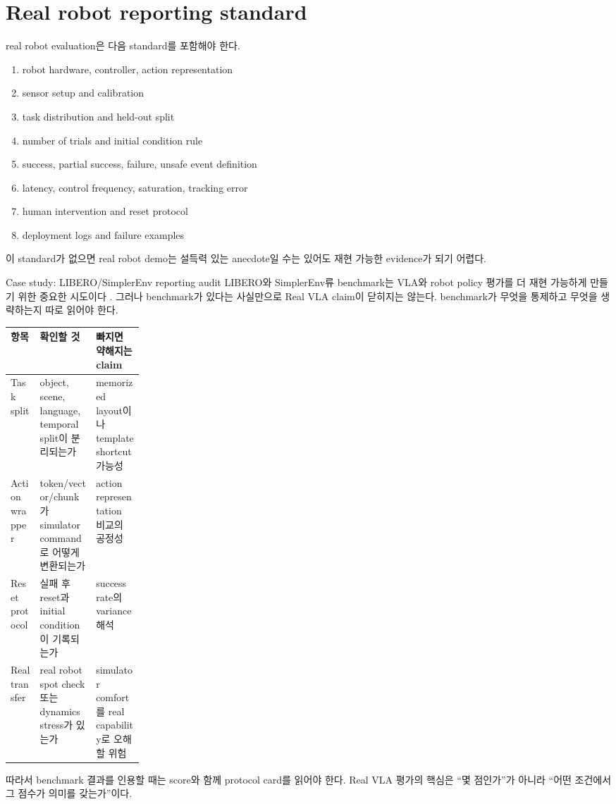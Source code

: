 \section{Real robot reporting standard}

real robot evaluation은 다음 standard를 포함해야 한다.
\begin{enumerate}
  \item robot hardware, controller, action representation
  \item sensor setup and calibration
  \item task distribution and held-out split
  \item number of trials and initial condition rule
  \item success, partial success, failure, unsafe event definition
  \item latency, control frequency, saturation, tracking error
  \item human intervention and reset protocol
  \item deployment logs and failure examples
\end{enumerate}

이 standard가 없으면 real robot demo는 설득력 있는 anecdote일 수는 있어도 재현 가능한 evidence가 되기 어렵다.

\begin{casebox}{Case study: LIBERO/SimplerEnv reporting audit}
LIBERO와 SimplerEnv류 benchmark는 VLA와 robot policy 평가를 더 재현 가능하게 만들기 위한 중요한 시도이다 \cite{libero2023,simplerenv2024}. 그러나 benchmark가 있다는 사실만으로 Real VLA claim이 닫히지는 않는다. benchmark가 무엇을 통제하고 무엇을 생략하는지 따로 읽어야 한다.

\begin{center}
\small
\begin{tabularx}{\linewidth}{@{}p{0.22\linewidth}X X@{}}
\toprule
항목 & 확인할 것 & 빠지면 약해지는 claim \\
\midrule
Task split & object, scene, language, temporal split이 분리되는가 & memorized layout이나 template shortcut 가능성 \\
Action wrapper & token/vector/chunk가 simulator command로 어떻게 변환되는가 & action representation 비교의 공정성 \\
Reset protocol & 실패 후 reset과 initial condition이 기록되는가 & success rate의 variance 해석 \\
Real transfer & real robot spot check 또는 dynamics stress가 있는가 & simulator comfort를 real capability로 오해할 위험 \\
\bottomrule
\end{tabularx}
\end{center}

따라서 benchmark 결과를 인용할 때는 score와 함께 protocol card를 읽어야 한다. Real VLA 평가의 핵심은 ``몇 점인가''가 아니라 ``어떤 조건에서 그 점수가 의미를 갖는가''이다.
\end{casebox}


